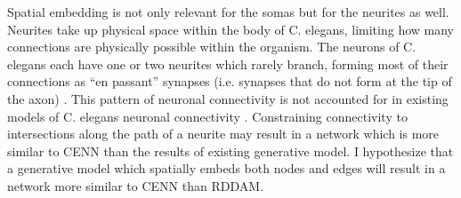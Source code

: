 Spatial embedding is not only relevant for the somas but for the neurites as well. 
Neurites take up physical space within the body of C. elegans, limiting how many connections are physically possible within the organism. 
The neurons of C. elegans each have one or two neurites which rarely branch, forming most of their connections as “en passant” synapses (i.e. synapses that do not form at the tip of the axon) \citep{Durbin,White}. 
This pattern of neuronal connectivity is not accounted for in existing models of C. elegans neuronal connectivity \citep{Costa,Itzhack,Khajezade,Nicosia}. 
Constraining connectivity to intersections along the path of a neurite may result in a network which is more similar to CENN than the results of existing generative model. 
I hypothesize that a generative model which spatially embeds both nodes and edges will result in a network more similar to CENN than RDDAM.
